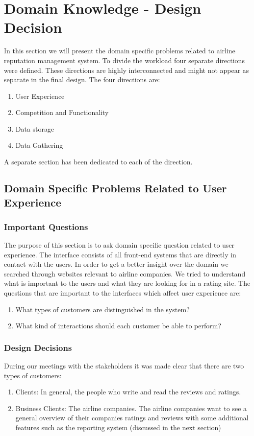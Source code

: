 \documentclass{article}
\begin{document}
\section{Domain Knowledge - Design Decision}
In this section we will present the domain specific problems related to airline reputation management system. To divide the workload four separate directions were defined. These  
directions are highly interconnected and might not appear as separate in the final design. The four directions are:
\begin{enumerate}
\item User Experience
\item Competition and Functionality
\item Data storage
\item Data Gathering
\end{enumerate}
A separate section has been dedicated to each of the direction. 

\subsection{Domain Specific Problems Related to User Experience}
\subsubsection{Important Questions}
The purpose of this section is to ask domain specific question related to user experience. The interface consists of all front-end systems that are directly in contact with the users. 
In order to get a better insight over the domain we searched through websites relevant to airline companies. We tried to understand what is important to the users and what they are looking for in
a rating site. The questions that  are important to the interfaces which affect user experience are:
\begin{enumerate}
\item What types of customers are distinguished in the system?
\item What kind of interactions should each customer be able to perform?
\end{enumerate}

\subsubsection{Design Decisions}
During our meetings with the stakeholders it was made clear that there are two types of customers:
\begin{enumerate} 
\item Clients: In general, the people who write and read the reviews and ratings.
\item Business Clients: The airline companies. The airline companies want to see a general overview of their companies ratings and reviews with some additional features such as the 
reporting system (discussed in the next section)
\end{enumerate}
\end{document}
